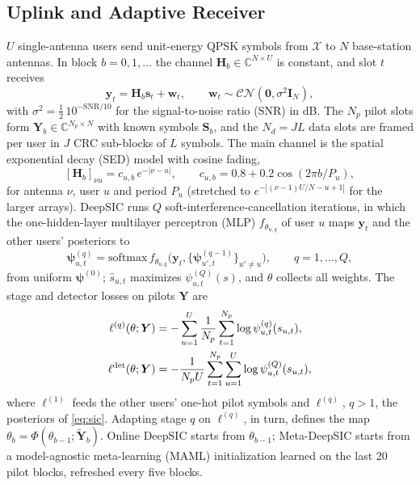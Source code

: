 \documentclass[journal]{IEEEtran}
\theoremstyle{remark}
\begin{document}
\subsection{Uplink and Adaptive Receiver}
$U$ single-antenna users send unit-energy QPSK symbols from $\mathcal X$ to $N$
base-station antennas. In block $b=0,1,\dots$ the channel $\bm H_b\in\mathbb C^{N\times U}$ is
constant, and slot $t$ receives
\begin{equation}\label{eq:channel}
\bm y_t=\bm H_b\bm s_t+\bm w_t,\qquad \bm w_t\sim\mathcal{CN}(\bm 0,\sigma^2\bm I_N),
\end{equation}
with $\sigma^2=\tfrac12\,10^{-\mathrm{SNR}/10}$ for the signal-to-noise ratio (SNR) in dB. The $N_p$
pilot slots form $\bm Y_b\in\mathbb C^{N_p\times N}$ with known symbols $\bm S_b$, and the $N_d=JL$ data
slots are framed per user in $J$ CRC sub-blocks of $L$ symbols. The main channel is the spatial
exponential decay (SED) model \cite{shlezinger2021} with cosine fading,
\begin{equation}\label{eq:sed}
[\bm H_b]_{\nu u}=c_{u,b}\,e^{-|\nu-u|},\qquad c_{u,b}=0.8+0.2\cos(2\pi b/P_u),
\end{equation}
for antenna $\nu$, user $u$ and period $P_u$ (stretched to $e^{-|(\nu-1)U/N-u+1|}$ for the larger
arrays). DeepSIC \cite{shlezinger2021} runs $Q$ soft-interference-cancellation
iterations, in which the one-hidden-layer multilayer perceptron (MLP) $f_{\theta_{u,q}}$ of user $u$
maps $\bm y_t$ and the other users' posteriors to
\begin{equation}\label{eq:sic}
\bm\psi^{(q)}_{u,t}=\mathrm{softmax}\,f_{\theta_{u,q}}\big(\bm y_t,
\{\bm\psi^{(q-1)}_{u',t}\}_{u'\ne u}\big),\qquad q=1,\dots,Q,
\end{equation}
from uniform $\bm\psi^{(0)}$; $\hat s_{u,t}$ maximizes $\psi^{(Q)}_{u,t}(s)$, and $\theta$ collects all
weights. The stage and detector losses on pilots $\bm Y$ are
\begin{equation}\label{eq:loss}
\begin{aligned}
\ell^{(q)}(\theta;\bm Y)&=-\sum_{u=1}^{U}\frac{1}{N_p}\sum_{t=1}^{N_p}\log\psi^{(q)}_{u,t}(s_{u,t}),\\
\ell^{\rm det}(\theta;\bm Y)&=-\frac{1}{N_pU}\sum_{t=1}^{N_p}\sum_{u=1}^{U}\log\psi^{(Q)}_{u,t}(s_{u,t}),
\end{aligned}
\end{equation}
where $\ell^{(1)}$ feeds the other users' one-hot pilot symbols and $\ell^{(q)}$, $q>1$, the posteriors
of \eqref{eq:sic}. Adapting stage $q$ on $\ell^{(q)}$, in turn, defines the map
$\theta_b=\Phi(\theta_{b-1};\tilde{\bm Y}_b)$. Online DeepSIC starts from $\theta_{b-1}$; Meta-DeepSIC
\cite{raviv2023} starts from a model-agnostic meta-learning (MAML) \cite{finn2017} initialization
learned on the last 20 pilot blocks, refreshed every five blocks.
\end{document}
